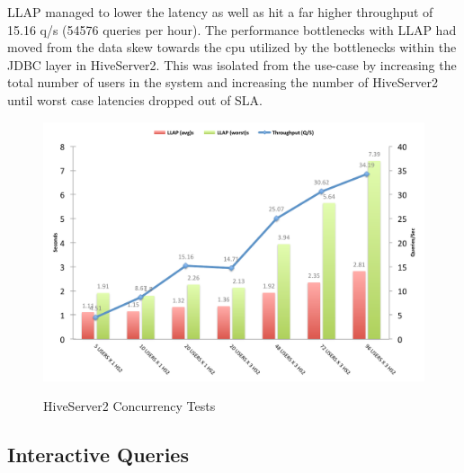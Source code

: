 LLAP managed to lower the latency as well as hit a far higher throughput of 15.16 q/s (54576 queries per hour). The 
performance bottlenecks with LLAP had moved from the data skew towards the cpu utilized by the bottlenecks within
the JDBC layer in HiveServer2. This was isolated from the use-case by increasing the total number of users in the system and
increasing the number of HiveServer2 until worst case latencies dropped out of SLA.


\begin{figure}[!h]
\centering
\includegraphics[width=0.9\columnwidth]{figures/throughput.pdf}
\label{fig:throughput}
\caption{HiveServer2 Concurrency Tests}
\end{figure}

\subsection{Interactive Queries}

